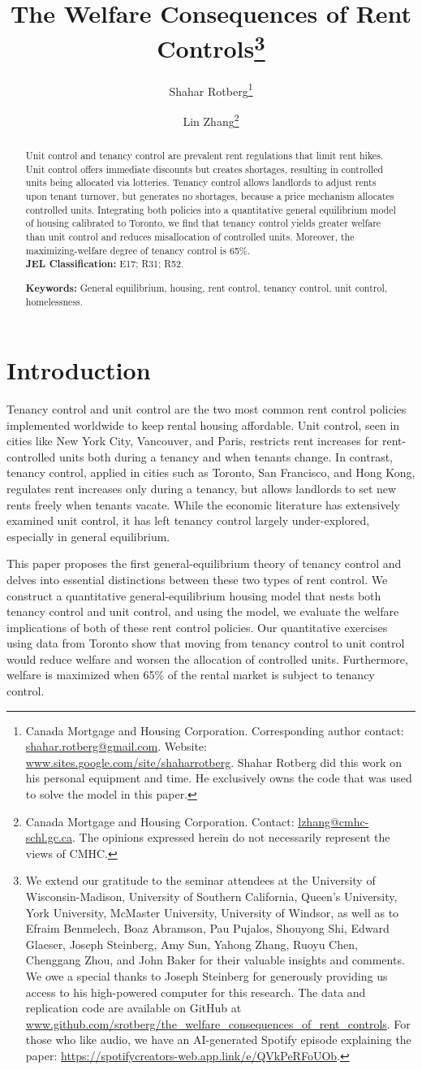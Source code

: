 \documentclass[parskip=full]{article}
\title{\vspace{-1.8cm}The Welfare Consequences of Rent Controls\footnote{We extend our gratitude to the seminar attendees at the University of Wisconsin-Madison, University of Southern California, Queen's University, York University, McMaster University, University of Windsor, as well as to Efraim Benmelech, Boaz Abramson, Pau Pujalos, Shouyong Shi, Edward Glaeser, Joseph Steinberg, Amy Sun, Yahong Zhang, Ruoyu Chen, Chenggang Zhou, and John Baker for their valuable insights and comments. We owe a special thanks to Joseph Steinberg for generously providing us access to his high-powered computer for this research. The data and replication code are available on GitHub at \url{www.github.com/srotberg/the_welfare_consequences_of_rent_controls}. For those who like audio, we have an AI-generated Spotify episode explaining the paper: \url{https://spotifycreators-web.app.link/e/QVkPeRFoUOb}.}}
\author{Shahar Rotberg\footnote{Canada Mortgage and Housing Corporation. Corresponding author contact: \url{shahar.rotberg@gmail.com}. Website: \url{www.sites.google.com/site/shaharrotberg}. Shahar Rotberg did this work on his personal equipment and time. He exclusively owns the code that was used to solve the model in this paper.} \and Lin Zhang\footnote{Canada Mortgage and Housing Corporation. Contact: \url{lzhang@cmhc-schl.gc.ca}. The opinions expressed herein do not necessarily represent the views of CMHC.}}
\begin{document}
\maketitle

\begin{abstract}
\onehalfspacing
\noindent

\noindent Unit control and tenancy control are prevalent rent regulations that limit rent hikes. Unit control offers immediate discounts but creates shortages, resulting in controlled units being allocated via lotteries. Tenancy control allows landlords to adjust rents upon tenant turnover, but generates no shortages, because a price mechanism allocates controlled units. Integrating both policies into a quantitative general equilibrium model of housing calibrated to Toronto, we find that tenancy control yields greater welfare than unit control and reduces misallocation of controlled units. Moreover, the maximizing-welfare degree of tenancy control is 65\%. 
\\[1.5ex]

\noindent \textbf{JEL Classification:} E17; R31; R52. 

\noindent \textbf{Keywords:} General equilibrium, housing, rent control, tenancy control, unit control, homelessness.
\end{abstract}

\section{Introduction}

Tenancy control and unit control are the two most common rent control policies implemented worldwide to keep rental housing affordable. Unit control, seen in cities like New York City, Vancouver, and Paris, restricts rent increases for rent-controlled units both during a tenancy and when tenants change. In contrast, tenancy control, applied in cities such as Toronto, San Francisco, and Hong Kong, regulates rent increases only during a tenancy, but allows landlords to set new rents freely when tenants vacate. While the economic literature has extensively examined unit control, it has left tenancy control largely under-explored, especially in general equilibrium. 

This paper proposes the first general-equilibrium theory of tenancy control and delves into essential distinctions between these two types of rent control. We construct a quantitative general-equilibrium housing model that nests both tenancy control and unit control, and using the model, we evaluate the welfare implications of both of these rent control policies. Our quantitative exercises using data from Toronto show that moving from tenancy control to unit control would reduce welfare and worsen the allocation of controlled units. Furthermore, welfare is maximized when 65\% of the rental market is subject to tenancy control.
\end{document}
